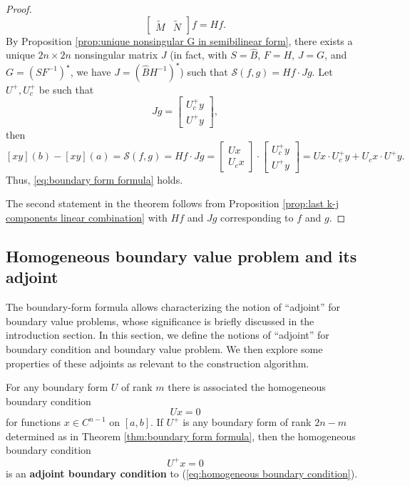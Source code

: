 \documentclass[11pt, oneside, a4paper]{article}
\begin{document}
\begin{proof}
\[\begin{bmatrix}
    \tilde{M} & \tilde{N}\end{bmatrix}f = Hf.\]
    By Proposition \ref{prop:unique nonsingular G in semibilinear form}, there exists a unique $2n\times 2n$ nonsingular matrix $J$ (in fact, with $S = \hat{B}$, $F=H$, $J=G$, and $G=(SF^{-1})^\star$, we have $J=(\hat{B}H^{-1})^\star$) such that $\mathcal{S}(f,g) = Hf\cdot Jg$. Let $U^+, U_c^+$ be such that
    \[Jg = \begin{bmatrix}U_c^+ y\\ U^+y\end{bmatrix},\]
    then 
    \[[xy](b)-[xy](a)=\mathcal{S}(f,g) = Hf\cdot Jg = \begin{bmatrix}Ux\\ U_cx\end{bmatrix}\cdot\begin{bmatrix}U_c^+ y \\ U^+y\end{bmatrix} = Ux\cdot U_c^+y + U_cx\cdot U^+y.\]
    Thus, \eqref{eq:boundary form formula} holds.

    The second statement in the theorem follows from Proposition \ref{prop:last k-j components linear combination} with $Hf$ and $Jg$ corresponding to $f$ and $g$.
\end{proof}

\subsection{Homogeneous boundary value problem and its adjoint}
The boundary-form formula allows characterizing the notion of ``adjoint'' for boundary value problems, whose significance is briefly discussed in the introduction section. In this section, we define the notions of ``adjoint'' for boundary condition and boundary value problem. We then explore some properties of these adjoints as relevant to the construction algorithm.

\begin{defn}\label{defn:adjoint boundary condition}
    For any boundary form $U$ of rank $m$ there is associated the homogeneous boundary condition
    \begin{equation}\label{eq:homogeneous boundary condition}
        Ux=0
    \end{equation}
    for functions $x\in C^{n-1}$ on $[a,b]$. If $U^+$ is any boundary form of rank $2n-m$ determined as in Theorem \ref{thm:boundary form formula}, then the homogeneous boundary condition
    \begin{equation}\label{eq:adjoint boundary condition}
        U^+x=0
    \end{equation}
    is an \textbf{adjoint boundary condition} to (\ref{eq:homogeneous boundary condition}).
\end{defn}
\end{document}
